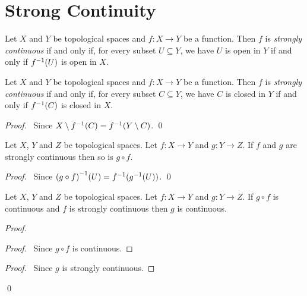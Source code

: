 \section{Strong Continuity}

\begin{definition}
    Let $X$ and $Y$ be topological spaces and $f : X \rightarrow Y$ be a function. Then $f$ is \emph{strongly continuous} if and only if, for every subset $U \subseteq Y$,
    we have $U$ is open in $Y$ if and only if ${f}^{-1}(U)$ is open in $X$.
\end{definition}

\begin{proposition}
    Let $X$ and $Y$ be topological spaces and $f : X \rightarrow Y$ be a function. Then $f$ is \emph{strongly continuous} if and only if, for every subset $C \subseteq Y$,
    we have $C$ is closed in $Y$ if and only if ${f}^{-1}(C)$ is closed in $X$.
\end{proposition}

\begin{proof}
    \pf\ Since $X \setminus {f}^{-1}(C) = {f}^{-1}(Y \setminus C)$. \qed
\end{proof}

\begin{proposition}
    \label{proposition:strongly_continuous_composite}
    Let $X$, $Y$ and $Z$ be topological spaces. Let $f : X \rightarrow Y$ and $g : Y \rightarrow Z$. If $f$ and $g$ are strongly continuous then so is $g \circ f$.
\end{proposition}

\begin{proof}
    \pf\ Since ${(g \circ f)}^{-1}(U) = {f}^{-1}({g}^{-1}(U))$. \qed
\end{proof}

\begin{proposition}
    \label{proposition:continuous_strongly_continuous}
    Let $X$, $Y$ and $Z$ be topological spaces.
    Let $f : X \rightarrow Y$ and $g : Y \rightarrow Z$.
    If $g \circ f$ is continuous and $f$ is strongly continuous then 
    $g$ is continuous.
\end{proposition}

\begin{proof}
    \pf
    \begin{proof}
        \pf\ Since $g \circ f$ is continuous.
    \end{proof}
    \begin{proof}
        \pf\ Since $g$ is strongly continuous.
    \end{proof}
    \qed
\end{proof}

